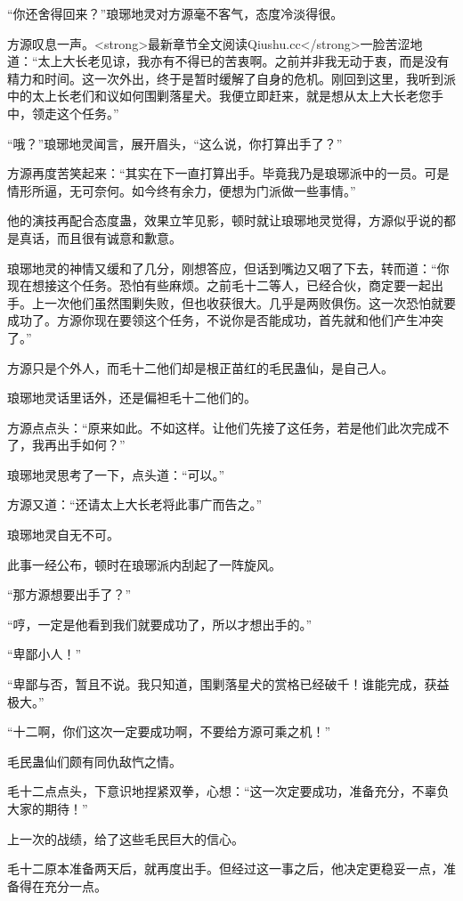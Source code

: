 \begin{this_body}
“你还舍得回来？”琅琊地灵对方源毫不客气，态度冷淡得很。

方源叹息一声。<strong>最新章节全文阅读Qiushu.cc</strong>一脸苦涩地道：“太上大长老见谅，我亦有不得已的苦衷啊。之前并非我无动于衷，而是没有精力和时间。这一次外出，终于是暂时缓解了自身的危机。刚回到这里，我听到派中的太上长老们和议如何围剿落星犬。我便立即赶来，就是想从太上大长老您手中，领走这个任务。”

“哦？”琅琊地灵闻言，展开眉头，“这么说，你打算出手了？”

方源再度苦笑起来：“其实在下一直打算出手。毕竟我乃是琅琊派中的一员。可是情形所逼，无可奈何。如今终有余力，便想为门派做一些事情。”

他的演技再配合态度蛊，效果立竿见影，顿时就让琅琊地灵觉得，方源似乎说的都是真话，而且很有诚意和歉意。

琅琊地灵的神情又缓和了几分，刚想答应，但话到嘴边又咽了下去，转而道：“你现在想接这个任务。恐怕有些麻烦。之前毛十二等人，已经合伙，商定要一起出手。上一次他们虽然围剿失败，但也收获很大。几乎是两败俱伤。这一次恐怕就要成功了。方源你现在要领这个任务，不说你是否能成功，首先就和他们产生冲突了。”

方源只是个外人，而毛十二他们却是根正苗红的毛民蛊仙，是自己人。

琅琊地灵话里话外，还是偏袒毛十二他们的。

方源点点头：“原来如此。不如这样。让他们先接了这任务，若是他们此次完成不了，我再出手如何？”

琅琊地灵思考了一下，点头道：“可以。”

方源又道：“还请太上大长老将此事广而告之。”

琅琊地灵自无不可。

此事一经公布，顿时在琅琊派内刮起了一阵旋风。

“那方源想要出手了？”

“哼，一定是他看到我们就要成功了，所以才想出手的。”

“卑鄙小人！”

“卑鄙与否，暂且不说。我只知道，围剿落星犬的赏格已经破千！谁能完成，获益极大。”

“十二啊，你们这次一定要成功啊，不要给方源可乘之机！”

毛民蛊仙们颇有同仇敌忾之情。

毛十二点点头，下意识地捏紧双拳，心想：“这一次定要成功，准备充分，不辜负大家的期待！”

上一次的战绩，给了这些毛民巨大的信心。

毛十二原本准备两天后，就再度出手。但经过这一事之后，他决定更稳妥一点，准备得在充分一点。


\end{this_body}
